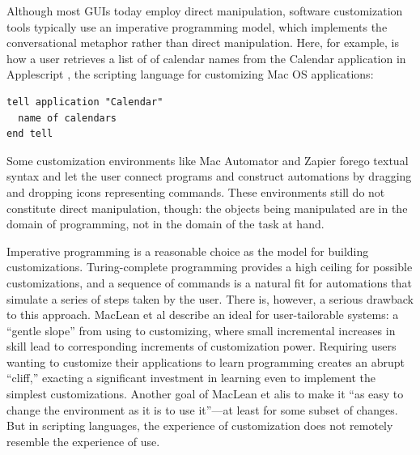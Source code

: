 \documentclass[sigplan,screen,10pt,anonymous,review]{acmart}
\providecommand{\DIFadd}[1]{{\protect\color{blue}\uwave{#1}}} %
\providecommand{\DIFaddbegin}{} %
\providecommand{\DIFaddend}{} %
\begin{document}
Although most GUIs today employ direct manipulation, software
customization tools typically use an imperative programming model, which
implements the conversational metaphor rather than direct manipulation.
Here, for example, is how a user retrieves a list of of calendar names
from the Calendar application in Applescript \citep{cook2007}, the
scripting language for customizing Mac OS applications:

\begin{verbatim}
tell application "Calendar"
  name of calendars
end tell
\end{verbatim}

Some customization environments like Mac Automator and Zapier forego
textual syntax and let the user connect programs and construct
automations by dragging and dropping icons representing commands. These
environments still do not constitute direct manipulation, though: the
objects being manipulated are in the domain of programming, not in the
domain of the task at hand.

Imperative programming is a reasonable choice as the model for building
customizations. Turing-complete programming provides a high ceiling for
possible customizations, and a sequence of commands is a natural fit for
automations that simulate a series of steps taken by the user. There is,
however, a serious drawback to this approach. MacLean et
al\DIFaddbegin \DIFadd{.~}\DIFaddend \citep{maclean1990} describe an ideal for user-tailorable systems: a
``gentle slope'' from using to customizing, where small incremental
increases in skill lead to corresponding increments of customization
power. Requiring users wanting to customize their applications to learn
programming creates an abrupt ``cliff,'' exacting a significant
investment in learning even to implement the simplest customizations.
Another goal of MacLean et al\DIFaddbegin \DIFadd{.~}\DIFaddend is to make it ``as easy to change the
environment as it is to use it''---at least for some subset of changes.
But in scripting languages, the experience of customization does not
remotely resemble the experience of use.
\end{document}
